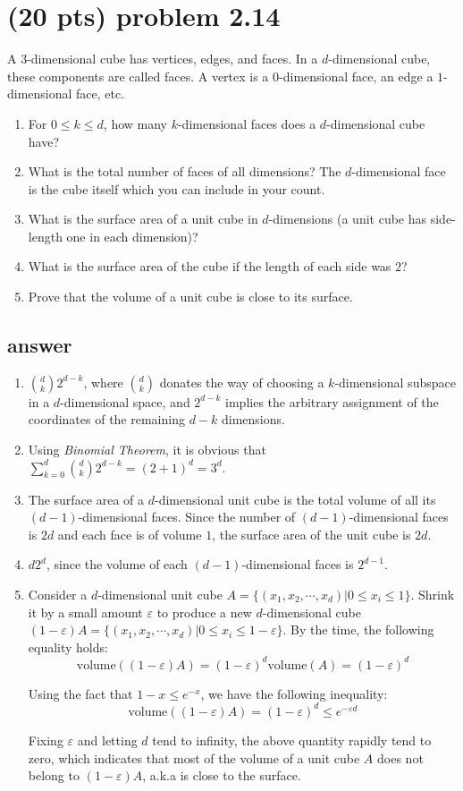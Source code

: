 \documentclass[12pt]{article}%
\begin{document}
\section{(20 pts) problem 2.14}
A $3$-dimensional cube has vertices, edges, and faces.
In a $d$-dimensional cube, these components are called faces.
A vertex is a $0$-dimensional face, an edge a $1$-dimensional face, etc.
\begin{enumerate}
    \item 
    For $0\leq k\leq d$, how many $k$-dimensional faces does a $d$-dimensional cube have?
    \item
    What is the total number of faces of all dimensions? The $d$-dimensional face is the cube itself which you can include in your count.
    \item
    What is the surface area of a unit cube in $d$-dimensions (a unit cube has side-length one in each dimension)?
    \item
    What is the surface area of the cube if the length of each side was $2$?
    \item
    Prove that the volume of a unit cube is close to its surface.
\end{enumerate}

\subsection*{answer}
\begin{enumerate}
	\item $\binom{d}{k}2^{d-k}$, where $\binom{d}{k}$ donates the way of choosing a $k$-dimensional subspace in a $d$-dimensional space, and $2^{d-k}$ implies the arbitrary assignment of the coordinates of the remaining $d - k$ dimensions.
	\item Using \textit{Binomial Theorem}, it is obvious that $\sum_{k=0}^{d}\binom{d}{k}2^{d-k} = (2+1)^d = 3^d$.
	\item The surface area of a $d$-dimensional unit cube is the total volume of all its $(d-1)$-dimensional faces. Since the number of $(d-1)$-dimensional faces is $2d$ and each face is of volume $1$, the surface area of the unit cube is $2d$.
	\item $d2^d$, since the volume of each $(d-1)$-dimensional faces is $2^{d-1}$.
	\item Consider a $d$-dimensional unit cube $A = \{(x_1, x_2, \cdots, x_d) | 0 \le x_i \le 1\}$. Shrink it by a small amount $\varepsilon$ to produce a new $d$-dimensional cube $(1 - \varepsilon)A = \{(x_1, x_2, \cdots, x_d) | 0 \le x_i \le 1 - \varepsilon\}$. By the time, the following equality holds:
	$$\text{volume}((1 - \varepsilon)A) = (1 - \varepsilon)^d\text{volume}(A) = (1 - \varepsilon)^d$$
	
	Using the fact that $1 - x \le e^{-x}$, we have the following inequality:
	$$\text{volume}((1 - \varepsilon)A) = (1 - \varepsilon)^d \le e^{-\varepsilon d}$$
	
	Fixing $\varepsilon$ and letting $d$ tend to infinity, the above quantity rapidly tend to zero, which indicates that most of the volume of a unit cube $A$ does not belong to $(1-\varepsilon)A$, a.k.a is close to the surface.
\end{enumerate}
\end{document}
